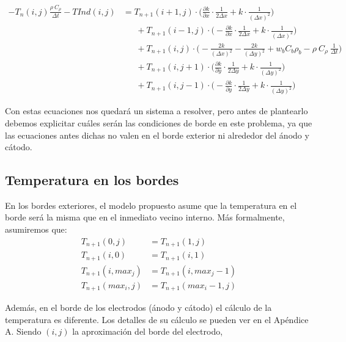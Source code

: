 \documentclass[a4paper]{article}
\begin{document}
\begin{equation*}
\begin{aligned}
- T_n(i,j) \frac{\rho \ C_\rho}{\Delta t} - TInd(i,j) &= T_{n+1}(i+1,j) \cdot \bigg(\frac{\partial k}{\partial x} \cdot \frac{1}{2\Delta x} +  k \cdot\frac{1}{(\Delta x)^2}\bigg) \\ & \ \ \ \ \ \ \ + T_{n+1}(i-1,j) \cdot \bigg(-\frac{\partial k}{\partial x} \cdot \frac{1}{2\Delta x} + k \cdot\frac{1}{(\Delta x)^2}\bigg) \\ & \ \ \ \ \ \ \ + T_{n+1}(i,j) \cdot \bigg(-\frac{2k}{(\Delta x)^2} -\frac{2k}{(\Delta y)^2} + w_b C_b \rho_b - \rho \ C_\rho \ \frac{1}{\Delta t}\bigg) \\ & \ \ \ \ \ \ \ + T_{n+1}(i,j+1) \cdot \bigg(\frac{\partial k}{\partial y} \cdot \frac{1}{2\Delta y} + k \cdot\frac{1}{(\Delta y)^2}\bigg) \\ & \ \ \ \ \ \ \  + T_{n+1}(i,j-1) \cdot \bigg(-\frac{\partial k}{\partial y} \cdot \frac{1}{2\Delta y} + k \cdot\frac{1}{(\Delta y)^2}\bigg)
\end{aligned}
\end{equation*}

Con estas ecuaciones nos quedará un sistema a resolver, pero antes de plantearlo debemos explicitar cuáles serán las condiciones de borde en este problema, ya que las ecuaciones antes dichas no valen en el borde exterior ni alrededor del ánodo y cátodo.

\subsection{Temperatura en los bordes}
En los bordes exteriores, el modelo propuesto asume que la temperatura en el borde será la misma que en el inmediato vecino interno. Más formalmente, asumiremos que:
\begin{equation*}
\begin{aligned}
T_{n+1}(0,j) & = T_{n+1}(1,j) \\ 
T_{n+1}(i,0) & = T_{n+1}(i,1) \\
T_{n+1}(i,max_j) & = T_{n+1}(i,max_j-1) \\ 
T_{n+1}(max_i,j) & = T_{n+1}(max_i-1,j)
\end{aligned}
\end{equation*}

Además, en el borde de los electrodos (ánodo y cátodo) el cálculo de la temperatura es diferente. Los detalles de su cálculo se pueden ver en el Apéndice A. Siendo $(i,j)$ la aproximación del borde del electrodo,
\end{document}
